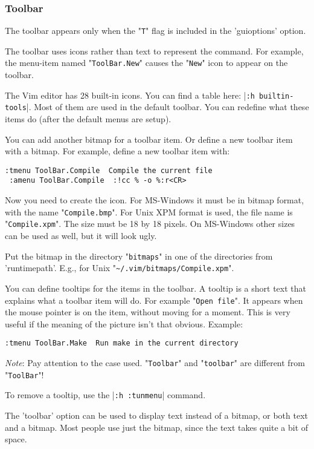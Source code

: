 \subsubsection{Toolbar}
The toolbar appears only when the "\verb!T!" flag is included in the 'guioptions' option.

The toolbar uses icons rather than text to represent the command.
For example, the {menu-item} named "\verb!ToolBar.New!" causes the "\verb!New!" icon to appear on the toolbar.

The Vim editor has 28 built-in icons.
You can find a table here: |\verb!:h builtin-tools!|.
Most of them are used in the default toolbar.
You can redefine what these items do (after the default menus are setup).

You can add another bitmap for a toolbar item.
Or define a new toolbar item with a bitmap.
For example, define a new toolbar item with:

\begin{Verbatim}[samepage=true]
 :tmenu ToolBar.Compile  Compile the current file
 :amenu ToolBar.Compile  :!cc % -o %:r<CR>
\end{Verbatim}

Now you need to create the icon.
For MS-Windows it must be in bitmap format, with the name "\verb!Compile.bmp!".
For Unix XPM format is used, the file name is "\verb!Compile.xpm!".
The size must be 18 by 18 pixels.
On MS-Windows other sizes can be used as well, but it will look ugly.

Put the bitmap in the directory "\verb!bitmaps!" in one of the directories from 'runtimepath'.
E.g., for Unix "\verb!~/.vim/bitmaps/Compile.xpm!".

You can define tooltips for the items in the toolbar.
A tooltip is a short text that explains what a toolbar item will do.
For example "\verb!Open file!".
It appears when the mouse pointer is on the item, without moving for a moment.
This is very useful if the meaning of the picture isn't that obvious.
Example:

\begin{Verbatim}[samepage=true]
 :tmenu ToolBar.Make  Run make in the current directory
\end{Verbatim}
 
\emph{Note}: Pay attention to the case used.
"\verb!Toolbar!" and "\verb!toolbar!" are different from "\verb!ToolBar!"!

To remove a tooltip, use the |\verb!:h :tunmenu!| command.

The 'toolbar' option can be used to display text instead of a bitmap, or both text and a bitmap.
Most people use just the bitmap, since the text takes quite a bit of space.

